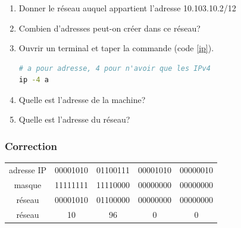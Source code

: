 \documentclass[svgnames,11pt]{beamer}
\begin{document}
\begin{frame}[fragile]
    \frametitle{}

    \begin{activite}
        \begin{enumerate}
            \item Donner le réseau auquel appartient l'adresse 10.103.10.2/12
            \item Combien d'adresses peut-on créer dans ce réseau?
            \item Ouvrir un terminal et taper la commande (code \ref{ip}).
            \begin{center}
                \begin{lstlisting}[language=bash]
# a pour adresse, 4 pour n'avoir que les IPv4
ip -4 a
                \end{lstlisting}
                \label{ip}
            \end{center}
    
            \item Quelle est l'adresse de la machine?
            \item Quelle est l'adresse du réseau?
        \end{enumerate}
    \end{activite}

\end{frame}
\begin{frame}
    \frametitle{Correction}

    \begin{center}
        \begin{tabular}{ccccc}
            adresse IP & 00001010 & 01100111 & 00001010 & 00000010 \\
            masque     & 11111111 & 11110000 & 00000000 & 00000000 \\
            réseau     & 00001010 & 01100000 & 00000000 & 00000000 \\
            réseau     & 10 & 96 & 0 & 0 \\
        \end{tabular}
    \end{center}

\end{frame}
\end{document}
